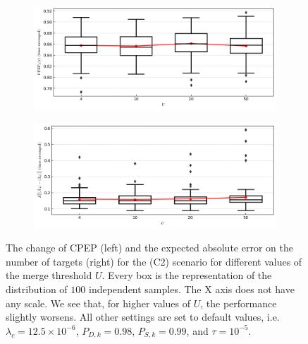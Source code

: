 \begin{figure}
    \centering
    \begin{subfigure}[]{0.48\linewidth}
        \centering
        \includegraphics[width=\linewidth]{figures/c2-u-cpep.png}
    \end{subfigure}
    \hfill
    \begin{subfigure}[]{0.48\linewidth}
        \centering
        \includegraphics[width=\linewidth]{figures/c2-u-eae.png}
    \end{subfigure}
  \caption[(C2). Change of performance depending on the merge threshold.]{The change of CPEP (left) and the expected absolute error on the number of targets (right) for the (C2) scenario for different values of the merge threshold $U$. Every box is the representation of the distribution of $100$ independent samples. The X axis does not have any scale. We see that, for higher values of $U$, the performance slightly worsens. All other settings are set to default values, i.e. $\lambda_{c} = 12.5 \times 10^{-6}$, $P_{D,k} = 0.98$, $P_{S,k} = 0.99$, and $\tau = 10^{-5}$.}
  \label{fig:c2-u}
\end{figure}

